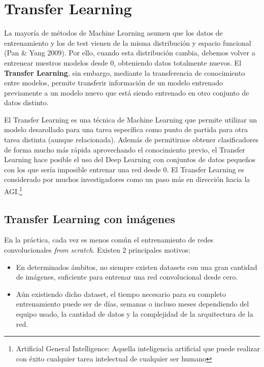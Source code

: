 \documentclass[
  12pt,
  spanish,
  a4paperpaper,
]{report}
\providecommand{\tightlist}{%
  \setlength{\itemsep}{0pt}\setlength{\parskip}{0pt}}
\begin{document}
\hypertarget{transfer-learning}{%
\section{Transfer Learning}\label{transfer-learning}}

La mayoría de métodos de Machine Learning asumen que los datos de
entrenamiento y los de test vienen de la misma distribución y espacio
funcional (Pan \& Yang 2009). Por ello, cuando esta distribución cambia,
debemos volver a entrenear nuestros modelos desde 0, obteniendo datos
totalmente nuevos. El \textbf{Transfer Learning}, sin embargo, mediante
la transferencia de conocimiento entre modelos, permite transferir
información de un modelo entrenado previamente a un modelo nuevo que
está siendo entrenado en otro conjunto de datos distinto.

El Transfer Learning es una técnica de Machine Learning que permite
utilizar un modelo desarollado para una tarea específica como punto de
partida para otra tarea distinta (aunque relacionada). Además de
permitirnos obtener clasificadores de forma mucho más rápida
aprovechando el conocimiento previo, el Transfer Learning hace posible
el uso del Deep Learning con conjuntos de datos pequeños con los que
sería imposible entrenar una red desde 0. El Transfer Learning es
considerado por muchos investigadores como un paso más en dirección
hacia la AGI.\footnote{Artificial General Intelligence: Aquella
  inteligencia artificial que puede realizar con éxito cualquier tarea
  intelectual de cualquier ser humano}

\hypertarget{transfer-learning-con-imuxe1genes}{%
\subsection{Transfer Learning con
imágenes}\label{transfer-learning-con-imuxe1genes}}

En la práctica, cada vez es menos común el entrenamiento de redes
convolucionales \emph{from scratch}. Existen 2 principales motivos:

\begin{itemize}
\tightlist
\item
  En determinados ámbitos, no siempre existen datasets con una gran
  cantidad de imágenes, suficiente para entrenar una red convolucional
  desde cero.
\item
  Aún existiendo dicho dataset, el tiempo necesario para su completo
  entrenamiento puede ser de días, semanas o incluso meses dependiendo
  del equipo usado, la cantidad de datos y la complejidad de la
  arquitectura de la red.
\end{itemize}
\end{document}
